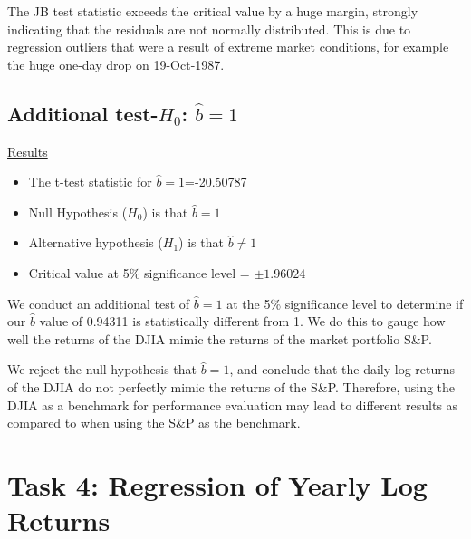 \documentclass[a4paper]{article}
\begin{document}
	The JB test statistic exceeds the critical value by a huge margin, strongly indicating that the residuals are not normally distributed. This is due to regression outliers that were a result of extreme market conditions, for example the huge one-day drop on 19-Oct-1987. 
	

	\subsection{Additional test-$H_0$: $\hat{b}=1$}
	\underline{Results}
	\begin{itemize}[nosep]
		\item The t-test statistic for $\hat{b}=1$=-20.50787
		\item Null Hypothesis ($H_0$) is that $\hat{b}=1$
		\item Alternative hypothesis ($H_1$) is that $\hat{b} \ne 1$
		\item Critical value at 5\% significance level = $\pm 1.96024$
	\end{itemize}

	We conduct an additional test of $\hat{b}=1$ at the 5\% significance level to determine if our $\hat{b}$ value of 0.94311 is statistically different from 1. We do this to gauge how well the returns of the DJIA mimic the returns of the market portfolio S\&P.
	
	We reject the null hypothesis that $\hat{b}=1$, and conclude that the daily log returns of the DJIA do not perfectly mimic the returns of the S\&P. Therefore, using the DJIA as a benchmark for performance evaluation may lead to different results as compared to when using the S\&P as the benchmark. 
		
	\section*{Task 4: Regression of Yearly Log Returns}
	\label{sec:num2}
	
\end{document}
